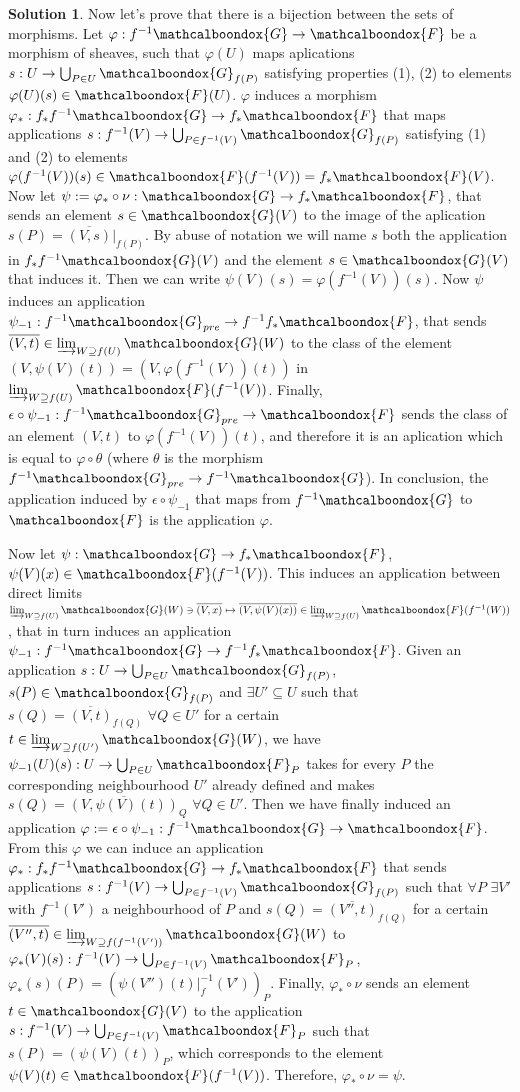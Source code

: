 \documentclass[12pt]{article}
\theoremstyle{definition}
\newtheorem*{sol}{Solution}
\newcommand{\sF}{\ensuremath{\mathcalboondox{F}}}
\newcommand{\sG}{\ensuremath{\mathcalboondox{G}}}
\begin{document}
\begin{sol}
	\vspace{3mm}

	Now let's prove that there is a bijection between the sets of morphisms. Let $\varphi: f^{-1}\sG \to \sF$ be a morphism of sheaves, such that $\varphi(U)$ maps aplications $s: U \to \bigcup_{P \in U} \sG_{f(P)}$ satisfying properties (1), (2) to elements $\varphi(U)(s) \in \sF(U)$.  $\varphi$ induces a morphism $\varphi_*: f_*f^{-1}\sG \to f_{*}\sF$ that maps applications $s: f^{-1}(V) \to \bigcup_{P \in f^{-1}(V)} \sG_{f(P)}$ satisfying (1) and (2) to elements $\varphi(f^{-1}(V))(s) \in \sF(f^{-1}(V)) = f_* \sF(V)$. Now let $\psi := \varphi_* \circ \nu : \sG \to f_* \sF$, that sends an element $s \in \sG(V)$ to the image of the aplication $s(P) = \overline{(V,s)}|_{f(P)}$. By abuse of notation we will name $s$ both the application in $f_*f^{-1}\sG(V)$ and the element $s \in \sG(V)$ that induces it. Then we can write $\psi(V)(s) = \varphi(f^{-1}(V))(s)$. Now $\psi$ induces an application $\psi_{-1}: f^{-1}\sG_{pre} \to f^{-1}f_*\sF$, that sends $\overline{(V,t)} \in \varinjlim_{W \supseteq f(U)} \sG(W)$ to the class of the element $(V,\psi(V)(t)) = (V, \varphi(f^{-1}(V))(t))$ in $\varinjlim_{W \supseteq f(U)} \sF(f^{-1}(V))$. Finally, $\epsilon \circ \psi_{-1}: f^{-1}\sG_{pre} \to \sF$ sends the class of an element $(V,t)$ to $\varphi(f^{-1}(V))(t)$, and therefore it is an aplication which is equal to $\varphi \circ \theta$ (where $\theta$ is the morphism $f^{-1}\sG_{pre} \to f^{-1}\sG$). In conclusion, the application induced by $\epsilon \circ \psi_{-1}$ that maps from $f^{-1}\sG$ to $\sF$ is the application $\varphi$.

	Now let $\psi: \sG \to f_* \sF$, $\psi(V)(x) \in \sF(f^{-1}(V))$. This induces an application between direct limits $\varinjlim_{W \supseteq f(U)} \sG(W) \ni \overline{(V,x)} \mapsto \overline{(V,\psi(V)(x))} \in \varinjlim_{W \supseteq f(U)} \sF(f^{-1}(W))$, that in turn induces an application $\psi_{-1}: f^{-1}\sG \to f^{-1}f_*\sF$. Given an application $s: U \to \bigcup_{P \in U} \sG_{f(P)}$, $s(P) \in \sG_{f(P)}$ and $\exists U'\subseteq U$ such that $s(Q) = \overline{(V,t)}_{f(Q)} \, \, \forall Q \in U'$ for a certain $t \in \varinjlim_{W \supseteq f(U')} \sG(W)$, we have $\psi_{-1}(U)(s): U \to \bigcup_{P \in U} \sF_P$ takes for every $P$ the corresponding neighbourhood $U'$ already defined and makes $s(Q) = \overline{(V, \psi(V)(t))}_{Q} \, \, \forall Q \in U'$. Then we have finally induced an application $\varphi:= \epsilon \circ \psi_{-1}: f^{-1}\sG \to \sF$. From this $\varphi$ we can induce an application $\varphi_*: f_*f^{-1}\sG \to f_* \sF$ that sends applications $s: f^{-1}(V) \to \bigcup_{P \in f^{-1}(V)} \sG_{f(P)}$ such that $\forall P$ $\exists V'$ with $f^{-1}(V')$ a neighbourhood of $P$ and $s(Q) = \overline{(V'',t)}_{f(Q)}$ for a certain $\overline{(V'',t)} \in \varinjlim_{W \supseteq f(f^{-1}(V'))} \sG(W)$ to $\varphi_*(V)(s): f^{-1}(V) \to \bigcup_{P \in f^{-1}(V)} \sF_P$, $\varphi_*(s)(P) = (\psi(V'')(t)|_f^{-1}(V'))_P$. Finally, $\varphi_* \circ \nu$ sends an element $t \in \sG(V)$ to the application $s: f^{-1}(V) \to \bigcup_{P \in f^{-1}(V)} \sF_P$ such that $s(P) = (\psi(V)(t))_{P}$, which corresponds to the element $\psi(V)(t) \in \sF(f^{-1}(V))$. Therefore, $\varphi_* \circ \nu = \psi$.


\end{sol}
\end{document}
